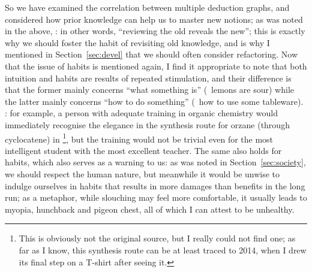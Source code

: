 So we have examined the correlation between multiple deduction graphs, and
considered how prior knowledge can help us to master new notions; as was noted
in the above, : in other words, ``reviewing the old reveals the new''; this is
exactly why we should foster the habit of revisiting old knowledge, and is why I
mentioned in Section~\ref{sec:devel} that we should often consider refactoring.
Now that the issue of habits is mentioned again, I find it appropriate to note
that both intuition and habits are results of repeated stimulation, and their
difference is that the former mainly concerns ``what something is'' (\eg~lemons
are sour) while the latter mainly concerns ``how to do something'' (\eg~how to
use some tableware).  : for example, a person with
adequate training in organic chemistry would immediately recognise the
elegance in the synthesis route for orzane (through cyclocatene) in \parencite%
{zxhxy2018}\footnote{This is obviously not the original source, but I really
could not find one; as far as I know, this synthesis route can be at least
traced to 2014, when I drew its final step on a T-shirt after seeing it.},
but the training would not be trivial even for the most intelligent student
with the most excellent teacher.  The same also holds for habits, which also
serves as a warning to us: as was noted in Section~\ref{sec:society}, we should
respect the human nature, but meanwhile it would be unwise to indulge ourselves
in habits that results in more damages than benefits in the long run; as a
metaphor, while slouching may feel more comfortable, it usually leads to
myopia, hunchback and pigeon chest, all of which I can attest to be unhealthy.

